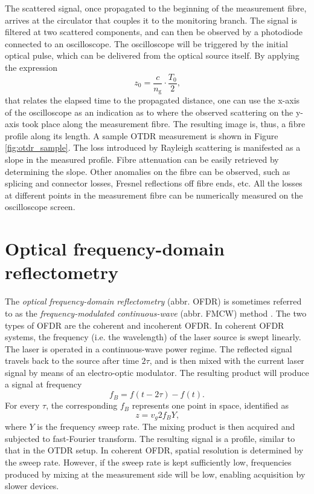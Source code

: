 \documentclass{standalone}
\begin{document}
The scattered signal, once propagated to the beginning of the measurement fibre, arrives at the circulator that couples it to the monitoring branch. The signal is filtered at two scattered components, and can then be observed by a photodiode connected to an oscilloscope. The oscilloscope will be triggered by the initial optical pulse, which can be delivered from the optical source itself. By applying the expression 
\begin{equation} \label{eq:otdr_time_distance}
z_0 = \frac{c}{n_\textrm{g}} \cdot \frac{T_0}{2} \textrm{,}
\end{equation}
that relates the elapsed time to the propagated distance, one can use the x-axis of the oscilloscope as an indication as to where the observed scattering on the y-axis took place along the measurement fibre. The resulting image is, thus, a fibre profile along its length. A sample OTDR measurement is shown in Figure \ref{fig:otdr_sample}.
The loss introduced by Rayleigh scattering is manifested as a slope in the measured profile. Fibre attenuation can be easily retrieved by determining the slope. Other anomalies on the fibre can be observed, such as splicing and connector losses, Fresnel reflections off fibre ends, etc. All the losses at different points in the measurement fibre can be numerically measured on the oscilloscope screen.\\


\section{Optical frequency-domain reflectometry}

The \textit{optical frequency-domain reflectometry} (abbr. OFDR) is sometimes referred to as the \textit{frequency-modulated continuous-wave} (abbr. FMCW) method \cite{Hartog2017} \cite{Farahani1999}. The two types of OFDR are the coherent and incoherent OFDR. In coherent OFDR systems, the frequency (i.e. the wavelength) of the laser source is swept linearly. The laser is operated in a continuous-wave power regime. The reflected signal travels back to the source after time $2 \tau$, and is then mixed with the current laser signal by means of an electro-optic modulator. The resulting product will produce a signal at frequency
\begin{equation}
f_B = f(t - 2 \tau) - f(t) \textrm{.}
\end{equation}
For every $\tau$, the corresponding $f_B$ represents one point in space, identified as
\begin{equation}
z = v_g 2 f_B Y \textrm{,}
\end{equation}
where $Y$ is the frequency sweep rate. The mixing product is then acquired and subjected to fast-Fourier transform. The resulting signal is a profile, similar to that in the OTDR setup. In coherent OFDR, spatial resolution is determined by the sweep rate. However, if the sweep rate is kept sufficiently low, frequencies produced by mixing at the measurement side will be low, enabling acquisition by slower devices. \\
\end{document}
